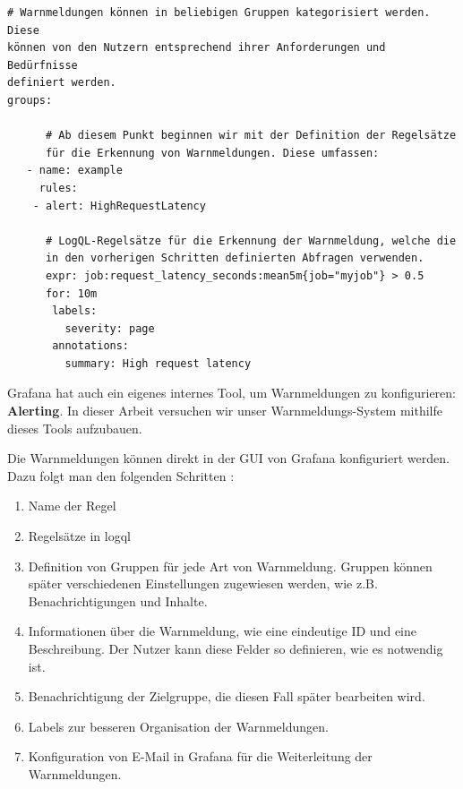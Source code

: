 {
\begin{Verbatim}[frame=single]
# Warnmeldungen können in beliebigen Gruppen kategorisiert werden. Diese
können von den Nutzern entsprechend ihrer Anforderungen und Bedürfnisse 
definiert werden.
groups:

      # Ab diesem Punkt beginnen wir mit der Definition der Regelsätze 
      für die Erkennung von Warnmeldungen. Diese umfassen:
   - name: example
     rules:
    - alert: HighRequestLatency

      # LogQL-Regelsätze für die Erkennung der Warnmeldung, welche die 
      in den vorherigen Schritten definierten Abfragen verwenden.
      expr: job:request_latency_seconds:mean5m{job="myjob"} > 0.5
      for: 10m
       labels:
         severity: page
       annotations:
         summary: High request latency
\end{Verbatim}
}


Grafana hat auch ein eigenes internes Tool, um Warnmeldungen zu konfigurieren: \textbf{Alerting}. In dieser Arbeit versuchen wir unser Warnmeldungs-System mithilfe dieses Tools aufzubauen.

Die Warnmeldungen können direkt in der \gls{GUI} von Grafana konfiguriert werden. Dazu folgt man den folgenden Schritten \citep{Grafana_alerting}:
{
\begin{enumerate}[noitemsep]
   \item Name der Regel
   \item Regelsätze in \gls{logql}
   \item Definition von Gruppen für jede Art von Warnmeldung. Gruppen können später verschiedenen Einstellungen zugewiesen werden, wie z.B. Benachrichtigungen und Inhalte.
   \item Informationen über die Warnmeldung, wie eine eindeutige ID und eine Beschreibung. Der Nutzer kann diese Felder so definieren, wie es notwendig ist.
   \item Benachrichtigung der Zielgruppe, die diesen Fall später bearbeiten wird.
   \item Labels zur besseren Organisation der Warnmeldungen.
   \item Konfiguration von E-Mail in Grafana für die Weiterleitung der Warnmeldungen.
\end{enumerate}
}


